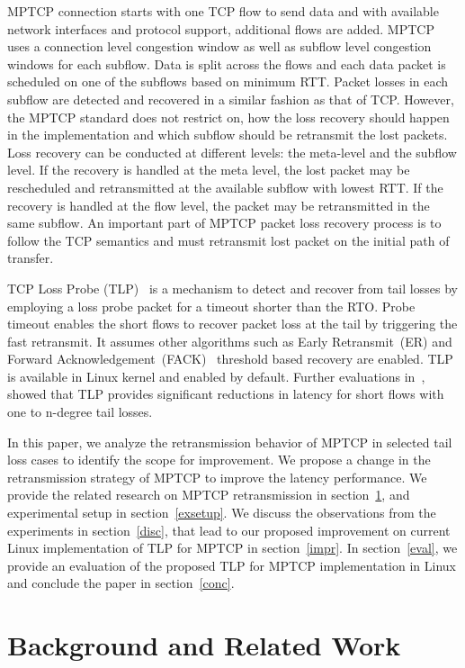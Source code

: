 \documentclass[10pt,conference,compsoc]{IEEEtran}
\begin{document}
 MPTCP connection starts with one TCP flow to send data and with available network interfaces and protocol support, additional flows are added. MPTCP uses a connection level congestion window as well as subflow level congestion windows for each subflow. Data is split across the flows and each data packet is scheduled on one of the subflows based on minimum RTT. Packet losses in each subflow are detected and recovered in a similar fashion as that of TCP. However, the MPTCP standard does not restrict on, how the loss recovery should happen in the implementation and which subflow should be retransmit the lost packets. Loss recovery can be conducted at different levels: the meta-level and the subflow level. If the recovery is handled at the meta level, the lost packet may be rescheduled and retransmitted at the available subflow with lowest RTT. If the recovery is handled at the flow level, the packet may be retransmitted in the same subflow. An important part of MPTCP packet loss recovery process is to follow the TCP semantics and must retransmit lost packet on the initial path of transfer. 


TCP Loss Probe (TLP)~\cite{Flach:2013} is a mechanism to detect and recover from tail losses by employing a loss probe packet for a timeout shorter than the RTO. Probe timeout enables the short flows to recover packet loss at the tail by triggering the fast retransmit. It assumes other algorithms such as Early Retransmit~(ER)\cite{rfc5827} and Forward Acknowledgement~(FACK)~\cite{FACK} threshold based recovery are enabled. TLP is available in Linux kernel and enabled by default. Further evaluations in~\cite{Rajiullah:2015}, showed that TLP provides significant reductions in latency for short flows with one to n-degree tail losses. 

In this paper, we analyze the retransmission behavior of MPTCP in selected tail loss cases to identify the scope for improvement. We propose a change in the retransmission strategy of MPTCP to improve the latency performance. We provide the related research on MPTCP retransmission in section~\ref{relwork}, and experimental setup in section~\ref{exsetup}. We discuss the observations from the experiments in section~\ref{disc}, that lead to our proposed improvement on current Linux implementation of TLP for MPTCP in section~\ref{impr}. In section~\ref{eval}, we provide an evaluation of the proposed TLP for MPTCP implementation in Linux and conclude the paper in section~\ref{conc}.
 
\section{Background and Related Work}\label{relwork}
\end{document}
